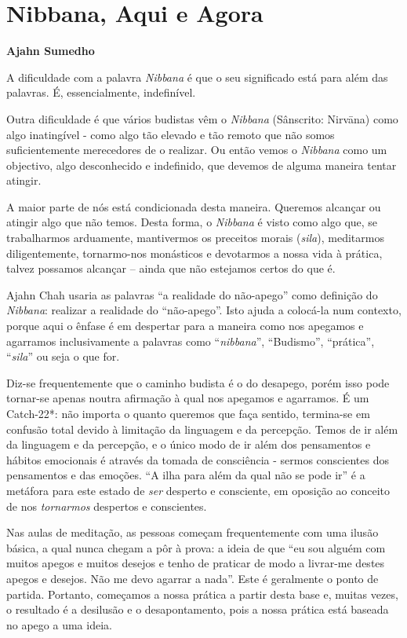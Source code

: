 \chapter{Nibbana, Aqui e Agora}

\textbf{Ajahn Sumedho}

A dificuldade com a palavra \emph{Nibbana} é que o seu significado está
para além das palavras. É, essencialmente, indefinível.

Outra dificuldade é que vários budistas vêm o \emph{Nibbana} (Sânscrito:
Nirvāna) como algo inatingível - como algo tão elevado e tão remoto que
não somos suficientemente merecedores de o realizar. Ou então vemos o
\emph{Nibbana} como um objectivo, algo desconhecido e indefinido, que
devemos de alguma maneira tentar atingir.

A maior parte de nós está condicionada desta maneira. Queremos alcançar
ou atingir algo que não temos. Desta forma, o \emph{Nibbana} é visto
como algo que, se trabalharmos arduamente, mantivermos os preceitos
morais (\emph{sila}), meditarmos diligentemente, tornarmo-nos monásticos
e devotarmos a nossa vida à prática, talvez possamos alcançar -- ainda
que não estejamos certos do que é.

Ajahn Chah usaria as palavras ``a realidade do não-apego'' como
definição do \emph{Nibbana}: realizar a realidade do ``não-apego''. Isto
ajuda a colocá-la num contexto, porque aqui o ênfase é em despertar para
a maneira como nos apegamos e agarramos inclusivamente a palavras como
``\emph{nibbana}'', ``Budismo'', ``prática'', ``\emph{sila}'' ou seja o
que for.

Diz-se frequentemente que o caminho budista é o do desapego, porém isso
pode tornar-se apenas noutra afirmação à qual nos apegamos e agarramos.
É um Catch-22*: não importa o quanto queremos que faça sentido,
termina-se em confusão total devido à limitação da linguagem e da
percepção. Temos de ir além da linguagem e da percepção, e o único modo
de ir além dos pensamentos e hábitos emocionais é através da tomada de
consciência - sermos conscientes dos pensamentos e das emoções. ``A ilha
para além da qual não se pode ir'' é a metáfora para este estado de
\emph{ser} desperto e consciente, em oposição ao conceito de nos
\emph{tornarmos} despertos e conscientes.

Nas aulas de meditação, as pessoas começam frequentemente com uma ilusão
básica, a qual nunca chegam a pôr à prova: a ideia de que ``eu sou
alguém com muitos apegos e muitos desejos e tenho de praticar de modo a
livrar-me destes apegos e desejos. Não me devo agarrar a nada''. Este é
geralmente o ponto de partida. Portanto, começamos a nossa prática a
partir desta base e, muitas vezes, o resultado é a desilusão e o
desapontamento, pois a nossa prática está baseada no apego a uma ideia.

